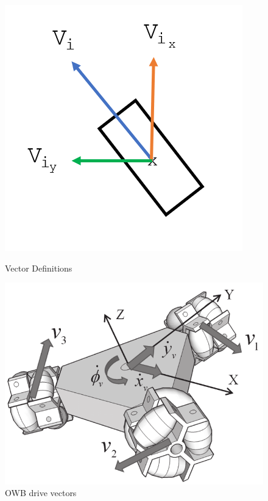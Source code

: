 \documentclass[journal,onecolumn, draftclsnofoot, 12pt]{IEEEtran}
\begin{document}
\begin{figure}[H]
  \centering
  \begin{minipage}[b]{0.45\linewidth}
    \centering
    \includegraphics[width=\linewidth]{wheel_vector.png}
    \caption{Vector Definitions}
    \label{fig:vecdef}
  \end{minipage}
  \hfill
  \begin{minipage}[b]{0.45\linewidth}
    \centering
    \includegraphics[width=\linewidth]{OWB_vectors.PNG}
    \caption{OWB drive vectors \cite{wada2015OWB}}
    \label{fig:owb_vec}
  \end{minipage}

  \label{fig:vecs}
\end{figure}
\end{document}
